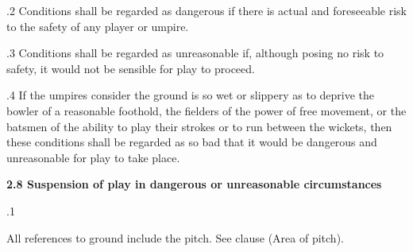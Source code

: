 \documentclass[12pt]{article}
\begin{document}
\vspace{\baselineskip}
\begin{adjustwidth}{0.5in}{0.08in}
{\fontsize{9pt}{10.8pt}.2 \tabto{0.49in} Conditions shall be regarded as dangerous if there is actual and foreseeable risk to the safety of any player or umpire.\par}\par

\end{adjustwidth}


\vspace{\baselineskip}
\begin{adjustwidth}{0.5in}{0.12in}
{\fontsize{9pt}{10.8pt}.3 \tabto{0.49in} Conditions shall be regarded as unreasonable if, although posing no risk to safety, it would not be sensible for play to proceed.\par}\par

\end{adjustwidth}


\vspace{\baselineskip}
\begin{adjustwidth}{0.5in}{0.21in}
{\fontsize{9pt}{10.8pt}.4 \tabto{0.49in} If the umpires consider the ground is so wet or slippery as to deprive the bowler of a reasonable foothold, the fielders of the power of free movement, or the batsmen of the ability to play their strokes or to run between the wickets, then these conditions shall be regarded as so bad that it would be dangerous and unreasonable for play to take place.\par}\par

\end{adjustwidth}


\vspace{\baselineskip}
{\fontsize{11pt}{13.2pt}\selectfont \textbf{2.8 \tabto{0.47in} Suspension of play in dangerous or unreasonable circumstances}\par}\par


\vspace{\baselineskip}
{\fontsize{9pt}{10.8pt}.1 \tabto{0.49in} {\fontsize{8pt}{9.6pt}\selectfont All references to ground include the pitch. See clause (Area of pitch).\par}\par}\par
\end{document}
